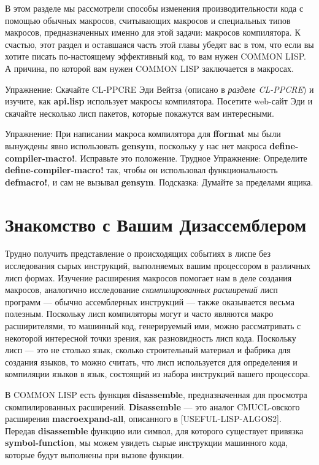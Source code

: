 В этом разделе мы рассмотрели способы изменения производительности кода с помощью обычных макросов, считывающих макросов и специальных типов макросов, предназначенных именно для этой задачи: макросов компилятора. К счастью, этот раздел и оставшаяся часть этой главы убедят вас в том, что если вы хотите писать по-настоящему эффективный код, то вам нужен COMMON LISP. А причина, по которой вам нужен COMMON LISP заключается в макросах.

Упражнение: Скачайте CL-PPCRE Эди Вейтза (описано в \emph{разделе CL-PPCRE}) и изучите, как \textbf{api.lisp} использует макросы компилятора. Посетите web-сайт Эди и скачайте несколько лисп пакетов, которые покажутся вам интересными.

Упражнение: При написании макроса компилятора для \textbf{fformat} мы были вынуждены явно использовать \textbf{gensym}, поскольку у нас нет макроса \textbf{define-compiler-macro!}. Исправьте это положение. Трудное Упражнение: Определите \textbf{define-compiler-macro!} так, чтобы он использовал функциональность \textbf{defmacro!}, и сам не вызывал \textbf{gensym}. Подсказка: Думайте за пределами ящика.

\section{Знакомство с Вашим Дизассемблером}\label{section_getting_to_know_your_disassembler}

Трудно получить представление о происходящих событиях в лиспе без исследования сырых инструкций, выполняемых вашим процессором в различных лисп формах. Изучение расширения макросов помогает нам в деле создания макросов, аналогично исследование \emph{скомпилированных расширений} лисп программ --- обычно ассемблерных инструкций --- также оказывается весьма полезным. Поскольку лисп компиляторы могут и часто являются макро расширителями, то машинный код, генерируемый ими, можно рассматривать с некоторой интересной точки зрения, как разновидность лисп кода. Поскольку лисп --- это не столько язык, сколько строительный материал и фабрика для создания языков, то можно считать, что лисп используется для определения и компиляции языков в язык, состоящий из набора инструкций вашего процессора.

В COMMON LISP есть функция \textbf{disassemble}, предназначенная для просмотра скомпилированных расширений. \textbf{Disassemble} --- это аналог CMUCL-овского расширения \textbf{macroexpand-all}, описанного в [USEFUL-LISP-ALGOS2]. Передав \textbf{disassemble} функцию или символ, для которого существует привязка \textbf{symbol-function}, мы можем увидеть сырые инструкции машинного кода, которые будут выполнены при вызове функции.

